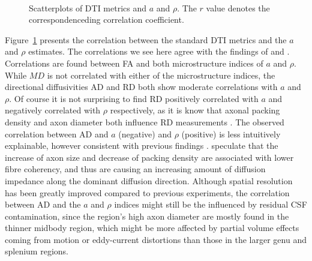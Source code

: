 \begin{figure}[ht]
{\begin{minipage}{0.5\textwidth}
					\begin{adjustbox}{width={\textwidth},totalheight=\textheight,keepaspectratio}
						\strut
						
					\end{adjustbox}\\
					\begin{adjustbox}{width={\textwidth},totalheight=\textheight,keepaspectratio}
						\strut
						
					\end{adjustbox}
					\end{minipage}
				}		
	\caption{Scatterplots of DTI metrics and $a$ and $\rho$. The $r$ value denotes the correspondenceding correlation coefficient.}
	\label{fig:chap 9 DTI correlations}	
\end{figure}	
Figure~\ref{fig:chap 9 DTI correlations} presents the correlation between the standard DTI metrics and the $a$ and $\rho$ estimates. The correlations we see here agree with the findings of \citep{Barazany:2009} and \citep{Alexander:2010}. Correlations are found between FA and both microstructure indices of $a$ and $\rho$. While $MD$ is not correlated with either of the microstructure indices, the directional diffusivities AD and RD both show moderate correlations with $a$ and $\rho$. Of course it is not surprising to find RD positively correlated with $a$ and negatively correlated with $\rho$ respectively, as it is know that axonal packing density and axon diameter both influence RD measurements \citep{Beaulieu:2002}. The observed correlation between AD and $a$ (negative) and $\rho$ (positive) is less intuitively explainable, however consistent with previous findings \citep{Barazany:2009,Alexander:2010}.  speculate that the increase of axon size and decrease of packing density are associated with lower fibre coherency, and thus are causing an increasing amount of diffusion impedance along the dominant diffusion direction. Although spatial resolution has been greatly improved compared to previous experiments, the correlation between AD and the $a$ and $\rho$ indices might still be the influenced by residual CSF contamination, since the region's high axon diameter are mostly found in the thinner midbody region, which might be more affected by partial volume effects coming from motion or eddy-current distortions than those in the larger genu and splenium regions. 
\egroup %
\FloatBarrier
